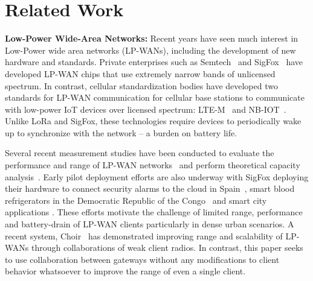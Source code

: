 \section{Related Work}
\label{sec:related-work}



\noindent \textbf{Low-Power Wide-Area Networks: } Recent years have seen much
interest in Low-Power wide area networks (LP-WANs), including the development
of new hardware and standards. Private enterprises such as
Semtech~\cite{Sornin2015, LoRaWanAlliance2015} and
SigFox~\cite{sanchez2016state} have developed LP-WAN chips that use extremely
narrow bands of unlicensed spectrum. In contrast, cellular standardization
bodies have developed two standards for LP-WAN communication for cellular base
stations to communicate with low-power IoT devices over licensed spectrum:
LTE-M~\cite{GSMAssociation2016} and NB-IOT~\cite{Ratasuk2016}. Unlike LoRa and
SigFox, these technologies require devices to periodically wake up to
synchronize with the network -- a burden on battery life.

Several recent measurement studies have been conducted to evaluate the
performance and range of LP-WAN networks~\cite{petric2016measurements,
7499263, toldov2016performance} and perform theoretical capacity
analysis~\cite{mikhaylov2016analysis}. Early pilot deployment efforts are also
underway with SigFox deploying their hardware to connect security alarms to
the cloud in Spain~\cite{sanchez2016state}, smart blood refrigerators in the
Democratic Republic of the Congo~\cite{ramachandranmupnp} and smart city
applications \cite{centenaro2015long}. These efforts motivate the challenge of
limited range, performance and battery-drain of LP-WAN clients particularly in dense urban scenarios. A recent system, Choir~\cite{eletreby2017empowering} has demonstrated improving range and scalability of LP-WANs through collaborations of weak client radios. In contrast, this paper seeks to use collaboration between gateways without any modifications to client behavior whatsoever to improve the range of even a single client. \\\vspace*{-0.1in}

